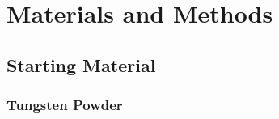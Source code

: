 
\chapter{Materials and Methods} %

\label{Chapter3} %


\lipsum[2-4]


\section{Starting Material}

\subsection{Tungsten Powder}

\lipsum[2-4]

